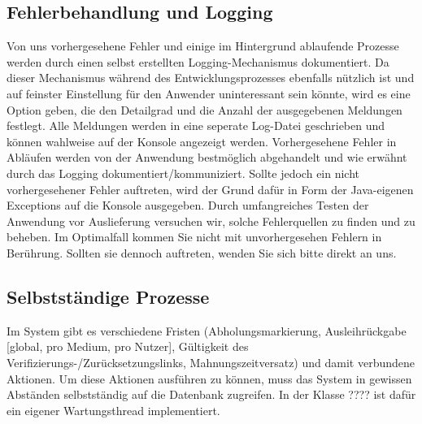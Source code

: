 \documentclass{article}
\begin{document}
\subsection{Fehlerbehandlung und Logging}
Von uns vorhergesehene Fehler und einige im Hintergrund ablaufende Prozesse werden durch einen selbst erstellten Logging-Mechanismus dokumentiert. Da dieser Mechanismus während des Entwicklungsprozesses ebenfalls nützlich ist und auf feinster Einstellung für den Anwender uninteressant sein könnte, wird es eine Option geben, die den Detailgrad und die Anzahl der ausgegebenen Meldungen festlegt. Alle Meldungen werden in eine seperate Log-Datei geschrieben und können wahlweise auf der Konsole angezeigt werden. Vorhergesehene Fehler in Abläufen werden von der Anwendung bestmöglich abgehandelt und wie erwähnt durch das Logging dokumentiert/kommuniziert. Sollte jedoch ein nicht vorhergesehener Fehler auftreten, wird der Grund dafür in Form der Java-eigenen Exceptions auf die Konsole ausgegeben. Durch umfangreiches Testen der Anwendung vor Auslieferung versuchen wir, solche Fehlerquellen zu finden und zu beheben. Im Optimalfall kommen Sie nicht mit unvorhergesehen Fehlern in Berührung. Sollten sie dennoch auftreten, wenden Sie sich bitte direkt an uns.
\subsection{Selbstständige Prozesse}
Im System gibt es verschiedene Fristen (Abholungsmarkierung, Ausleihrückgabe [global, pro Medium, pro Nutzer], Gültigkeit des Verifizierungs-/Zurücksetzungslinks, Mahnungszeitversatz) und damit verbundene Aktionen. Um diese Aktionen ausführen zu können, muss das System in gewissen Abständen selbstständig auf die Datenbank zugreifen. In der Klasse ???? ist dafür ein eigener Wartungsthread implementiert.
\end{document}
